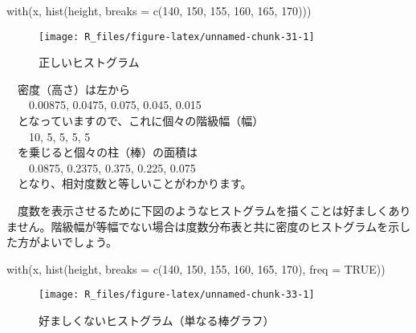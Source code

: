 \documentclass[
  12pt,
]{book}
\newenvironment{Shaded}{\begin{snugshade}}{\end{snugshade}}
\newcommand{\AttributeTok}[1]{\textcolor[rgb]{0.77,0.63,0.00}{#1}}
\newcommand{\ConstantTok}[1]{\textcolor[rgb]{0.00,0.00,0.00}{#1}}
\newcommand{\DecValTok}[1]{\textcolor[rgb]{0.00,0.00,0.81}{#1}}
\newcommand{\FunctionTok}[1]{\textcolor[rgb]{0.00,0.00,0.00}{#1}}
\newcommand{\NormalTok}[1]{#1}
\begin{document}
\begin{Shaded}
\begin{Highlighting}[]
\FunctionTok{with}\NormalTok{(x, }\FunctionTok{hist}\NormalTok{(height, }\AttributeTok{breaks =} \FunctionTok{c}\NormalTok{(}\DecValTok{140}\NormalTok{, }\DecValTok{150}\NormalTok{, }\DecValTok{155}\NormalTok{, }\DecValTok{160}\NormalTok{, }\DecValTok{165}\NormalTok{, }\DecValTok{170}\NormalTok{)))}
\end{Highlighting}
\end{Shaded}

\begin{figure}[H]

{\centering \texttt{[image: R\_files/figure-latex/unnamed-chunk-31-1]} 

}

\caption{正しいヒストグラム}\label{fig:unnamed-chunk-31}
\end{figure}

　密度（高さ）は左から\\
　　0.00875, 0.0475, 0.075, 0.045, 0.015\\
　となっていますので、これに個々の階級幅（幅）\\
　　10, 5, 5, 5, 5\\
　を乗じると個々の柱（棒）の面積は\\
　　0.0875, 0.2375, 0.375, 0.225, 0.075\\
　となり、相対度数と等しいことがわかります。　

　度数を表示させるために下図のようなヒストグラムを描くことは好ましくありません。階級幅が等幅でない場合は度数分布表と共に密度のヒストグラムを示した方がよいでしょう。

\begin{Shaded}
\begin{Highlighting}[]
\FunctionTok{with}\NormalTok{(x, }\FunctionTok{hist}\NormalTok{(height, }\AttributeTok{breaks =} \FunctionTok{c}\NormalTok{(}\DecValTok{140}\NormalTok{, }\DecValTok{150}\NormalTok{, }\DecValTok{155}\NormalTok{, }\DecValTok{160}\NormalTok{, }\DecValTok{165}\NormalTok{, }\DecValTok{170}\NormalTok{), }\AttributeTok{freq =} \ConstantTok{TRUE}\NormalTok{))}
\end{Highlighting}
\end{Shaded}

\begin{figure}[H]

{\centering \texttt{[image: R\_files/figure-latex/unnamed-chunk-33-1]} 

}

\caption{好ましくないヒストグラム（単なる棒グラフ）}\label{fig:unnamed-chunk-33}
\end{figure}
\end{document}
